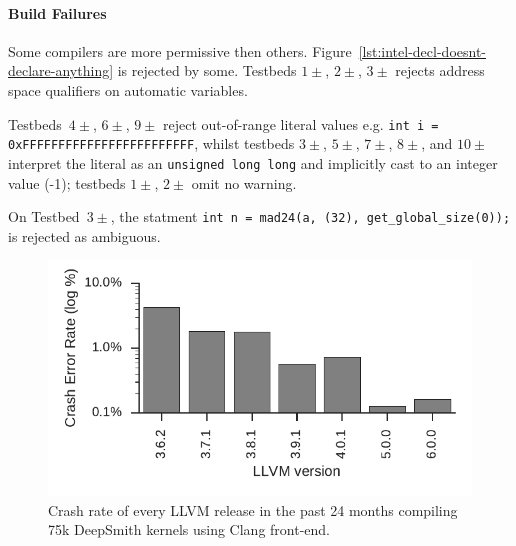 \paragraph{Build Failures} Some compilers are more permissive then others. Figure~\ref{lst:intel-decl-doesnt-declare-anything} is rejected by some. Testbeds $1\pm$, $2\pm$, $3\pm$ rejects address space qualifiers on automatic variables.

Testbeds~$4\pm$, $6\pm$, $9\pm$ reject out-of-range literal values e.g. \texttt{int i = 0xFFFFFFFFFFFFFFFFFFFFFFFF}, whilst testbeds $3\pm$, $5\pm$, $7\pm$, $8\pm$, and $10\pm$ interpret the literal as an \texttt{unsigned long long} and implicitly cast to an integer value (-1); testbeds $1\pm$, $2\pm$ omit no warning.

On Testbed~$3\pm$, the statment \texttt{int n = mad24(a, (32), get\_global\_size(0));} is rejected as ambiguous.



\begin{figure}
  \centering %
  \includegraphics[width=.95\columnwidth]{build/img/clang-crashes}%
  \caption{%
    Crash rate of every LLVM release in the past 24 months compiling 75k DeepSmith kernels using Clang front-end.%
  }%
  \label{fig:clangs} %
\end{figure}

\begin{table}
  \scriptsize %
  \centering %
  
  \caption{%
    Distinct Clang front-end assertions triggered by DeepSmith, and the number of distinct unreachables.%
  }
  \label{tab:clangs}
\end{table}


